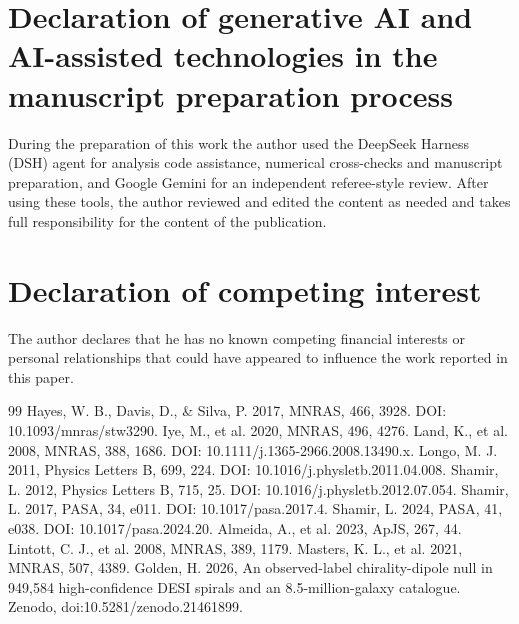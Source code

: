 \documentclass[linenumbers]{aa}
\begin{document}
\section*{Declaration of generative AI and AI-assisted technologies in the manuscript preparation process}
During the preparation of this work the author used the DeepSeek Harness (DSH) agent for analysis
code assistance, numerical cross-checks and manuscript preparation, and Google Gemini for an
independent referee-style review. After using these tools, the author reviewed and edited the
content as needed and takes full responsibility for the content of the publication.

\section*{Declaration of competing interest}
The author declares that he has no known competing financial interests or personal relationships
that could have appeared to influence the work reported in this paper.

\begin{thebibliography}{99}
 Hayes, W. B., Davis, D., \& Silva, P. 2017, MNRAS, 466, 3928. DOI: 10.1093/mnras/stw3290.
 Iye, M., et al. 2020, MNRAS, 496, 4276.
 Land, K., et al. 2008, MNRAS, 388, 1686. DOI: 10.1111/j.1365-2966.2008.13490.x.
 Longo, M. J. 2011, Physics Letters B, 699, 224. DOI: 10.1016/j.physletb.2011.04.008.
 Shamir, L. 2012, Physics Letters B, 715, 25. DOI: 10.1016/j.physletb.2012.07.054.
 Shamir, L. 2017, PASA, 34, e011. DOI: 10.1017/pasa.2017.4.
 Shamir, L. 2024, PASA, 41, e038. DOI: 10.1017/pasa.2024.20.
 Almeida, A., et al. 2023, ApJS, 267, 44.
 Lintott, C. J., et al. 2008, MNRAS, 389, 1179.
 Masters, K. L., et al. 2021, MNRAS, 507, 4389.
 Golden, H. 2026, An observed-label chirality-dipole null in 949,584 high-confidence DESI spirals and an 8.5-million-galaxy catalogue. Zenodo, doi:10.5281/zenodo.21461899.
\end{thebibliography}
\end{document}
